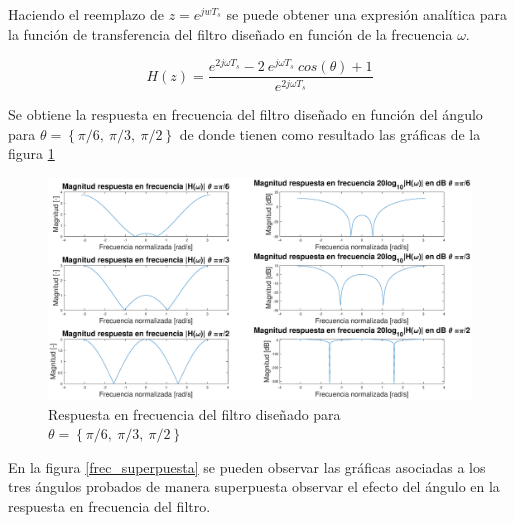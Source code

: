 \begin{enumerate}
    
    Haciendo el reemplazo de $z = e^{jwT_s}$ se puede obtener una expresión analítica para la función de transferencia del filtro diseñado en función de la frecuencia $\omega$.
    
        $$ H(z) = \frac{e^{2 j \omega T_s} - 2~e^{j \omega T_s}~cos(\theta)+ 1}{e^{2 j \omega T_s}}$$
    

    
    Se obtiene la respuesta en frecuencia del filtro diseñado  en función del ángulo para   $ \theta = \left \lbrace \pi/6,~ \pi/3,~\pi/2 \right \rbrace$   de donde tienen como resultado las gráficas de la figura \ref{frec_resp}
    
\begin{figure}[H]
    \centering
    \includegraphics[scale = 0.3]{Figuras/p1_1-Respuesta_en_frecuencia.eps}
    \caption{Respuesta en frecuencia del filtro diseñado para  $ \theta = \left \lbrace \pi/6,~ \pi/3,~\pi/2 \right \rbrace$ }
    \label{frec_resp}
\end{figure}
    
    
    
    En la figura \ref{frec_superpuesta} se pueden observar las gráficas asociadas a los tres ángulos probados de manera superpuesta observar el efecto del ángulo en la respuesta en frecuencia del filtro.
    

\end{enumerate}
